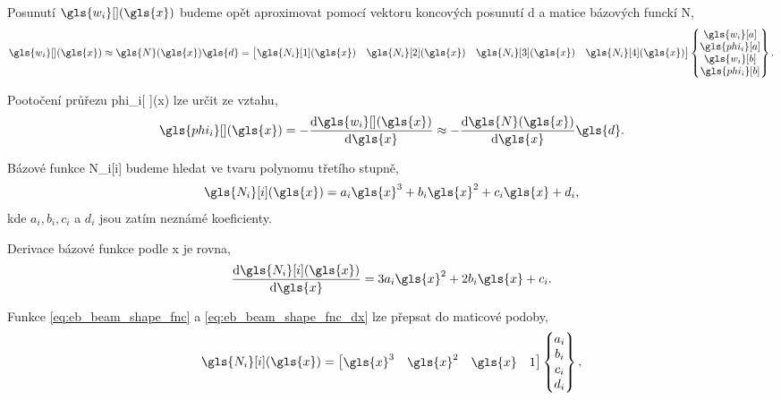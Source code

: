 Posunutí $\gls{w_i}[ ](\gls{x})$ budeme opět aproximovat pomocí vektoru koncových posunutí \gls{d} a matice bázových funckí \gls{N},
\begin{equation}
    \label{eq:deformation_approximation}
    \gls{w_i}[ ](\gls{x}) \approx \gls{N}(\gls{x}) \gls{d} = 
    \begin{bmatrix}
        \gls{N_i}[1](\gls{x}) &
        \gls{N_i}[2](\gls{x}) & 
        \gls{N_i}[3](\gls{x}) & 
        \gls{N_i}[4](\gls{x}) 
    \end{bmatrix}
    \begin{Bmatrix}
        \gls{w_i}[a] \\
        \gls{phi_i}[a] \\
        \gls{w_i}[b] \\
        \gls{phi_i}[b] \\
    \end{Bmatrix}.
\end{equation}

Pootočení průřezu \gls{phi_i}[ ](\gls{x}) lze určit ze vztahu,
\begin{equation}
    \label{eq:rotation_approximation}
    \gls{phi_i}[ ](\gls{x}) = - \dv{\gls{w_i}[ ](\gls{x})}{\gls{x}} \approx - \dv{\gls{N}(\gls{x})}{\gls{x}} \gls{d}.
\end{equation}

Bázové funkce \gls{N_i}[i] budeme hledat ve tvaru polynomu třetího stupně,
\begin{equation}
    \label{eq:eb_beam_shape_fnc}
    \gls{N_i}[i](\gls{x}) = a_{i} \gls{x}^{3} + b_{i} \gls{x}^{2} + c_{i} \gls{x} + d_{i},
\end{equation}
kde $a_i, b_i, c_i$ a $d_i$ jsou zatím neznámé koeficienty.

Derivace bázové funkce podle \gls{x} je rovna,
\begin{equation}
    \label{eq:eb_beam_shape_fnc_dx}
    \dv{\gls{N_i}[i](\gls{x})}{\gls{x}} = 3 a_{i} \gls{x}^{2} + 2 b_{i} \gls{x} + c_{i}.
\end{equation}


Funkce \ref{eq:eb_beam_shape_fnc} a \ref{eq:eb_beam_shape_fnc_dx} lze přepsat do maticové podoby,
\begin{equation}
    \label{eq:shape_function_coefficients_vector}
    \gls{N_i}[i](\gls{x}) = 
    \begin{bmatrix}
        \gls{x}^3 &
        \gls{x}^2 &
        \gls{x} &
        1
    \end{bmatrix}
    \begin{Bmatrix}
        a_i \\
        b_i \\
        c_i \\
        d_i \\
    \end{Bmatrix},
\end{equation}

